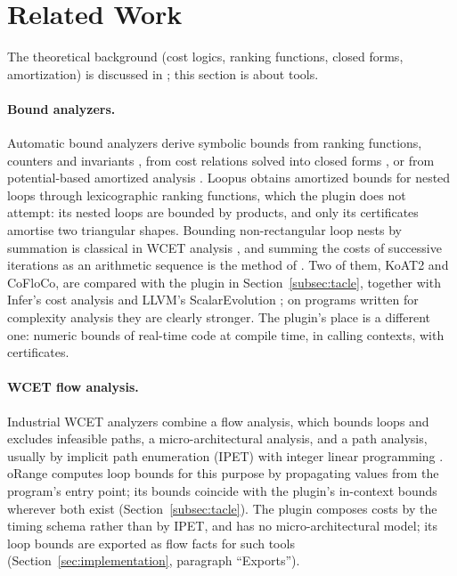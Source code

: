 \documentclass[oneside,english]{amsart}
\numberwithin{equation}{section}
\numberwithin{figure}{section}
\theoremstyle{plain}
\theoremstyle{definition}
\theoremstyle{plain}
\theoremstyle{remark}
\theoremstyle{plain}
\theoremstyle{definition}
\theoremstyle{plain}
\theoremstyle{remark}
\begin{document}
\section{Related Work}
\label{sec:related}

The theoretical background (cost logics, ranking functions, closed forms, amortization) is discussed in \cite{crosscheckTheory}; this section is about tools.

\paragraph{Bound analyzers.}
Automatic bound analyzers derive symbolic bounds from ranking functions, counters and invariants \cite{gulwani2009speed,alias2010multi,sinn2014complexity,brockschmidt2016analyzing,lommen2022automatic}, from cost relations solved into closed forms \cite{albert2011closed,floresmontoya2014cofloco}, or from potential-based amortized analysis \cite{hoffmann2012multivariate,carbonneaux2015compositional}. Loopus \cite{sinn2014complexity} obtains amortized bounds for nested loops through lexicographic ranking functions, which the plugin does not attempt: its nested loops are bounded by products, and only its certificates amortise two triangular shapes. Bounding non-rectangular loop nests by summation is classical in WCET analysis \cite{healy2000supporting}, and summing the costs of successive iterations as an arithmetic sequence is the method of \cite{albert2011more}. Two of them, KoAT2 and CoFloCo, are compared with the plugin in Section~\ref{subsec:tacle}, together with Infer's cost analysis \cite{infercost} and LLVM's ScalarEvolution \cite{lattner2004llvm}; on programs written for complexity analysis they are clearly stronger. The plugin's place is a different one: numeric bounds of real-time code at compile time, in calling contexts, with certificates.

\paragraph{WCET flow analysis.}
Industrial WCET analyzers combine a flow analysis, which bounds loops and excludes infeasible paths, a micro-architectural analysis, and a path analysis, usually by implicit path enumeration (IPET) with integer linear programming \cite{wilhelm2008worst,li1995ilp}. oRange \cite{demichiel2008orange} computes loop bounds for this purpose by propagating values from the program's entry point; its bounds coincide with the plugin's in-context bounds wherever both exist (Section~\ref{subsec:tacle}). The plugin composes costs by the timing schema \cite{shaw1989reasoning,puschner1989calculating} rather than by IPET, and has no micro-architectural model; its loop bounds are exported as flow facts for such tools (Section~\ref{sec:implementation}, paragraph ``Exports'').
\end{document}
